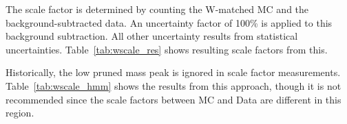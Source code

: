 \documentclass{article}
\begin{document}
The scale factor is determined by counting the W-matched MC and the background-subtracted data.
An uncertainty factor of 100\% is applied to this background subtraction.
All other uncertainty results from statistical uncertainties.
Table~\ref{tab:wscale_res} shows resulting scale factors from this.



Historically, the low pruned mass peak is ignored in scale factor measurements. 
Table~\ref{tab:wscale_hmm} shows the results from this approach, though it is not recommended
since the scale factors between MC and Data are different in this region.


  
\end{document}
